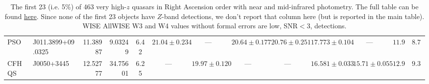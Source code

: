 \begin{table}
\begin{tabular}{llrrc cccc cccc}
PSO & J011.3899+09.0325 &   11.38987 &    9.03249 &  6.42   &   $21.04\pm0.234$  &  ---  &  $20.64\pm0.177$   & $20.76\pm0.251$    &   $17.773\pm0.104$   &  ---   &   $11.98$   &   $ 8.78$   \\
CFHQS & J0050+3445 &   12.52777 &   34.75601 &  6.25   &   ---  &  $19.97\pm0.120$  &  ---   & ---    &   $16.581\pm0.033$   &  $15.71\pm0.055$   &   $12.93$   &   $ 9.30$   \\
    \hline
    \hline
    \end{tabular}
    \caption{The first 23 (i.e. 5\%) of 463 very high-$z$ quasars in Right Ascension order with near and mid-infrared photometry. 
                  The full table can be found \href{https://github.com/d80b2t/VHzQ/tree/master/data}{here}. 
                  Since none of the first 23 objects have $Z$-band detections, we don't report that column here 
                  (but is reported in the main table). 
                  WISE AllWISE W3 and W4 values without formal errors are low, SNR$<3$, detections.
                } 
     \label{tab:output_table}
     \end{table}
     
